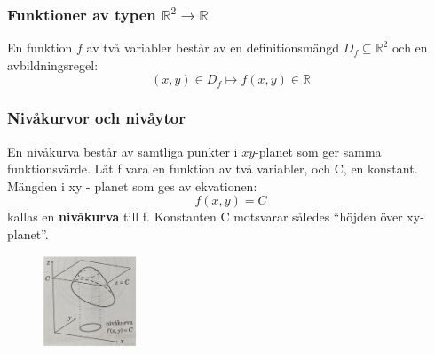 \documentclass[a4paper,12pt]{article}
\begin{document}
\subsubsection*{Funktioner av typen $\mathbb{R}^2 \to \mathbb{R}$}
En funktion $f$ av två variabler består av en definitionsmängd $D_f \subseteq \mathbb{R}^2$ och en avbildningsregel:
\[
(x,y) \in D_f \mapsto f(x,y) \in \mathbb{R}
\]

\subsubsection*{Nivåkurvor och nivåytor}
En nivåkurva består av samtliga punkter i $xy$-planet som ger samma funktionsvärde. 
Låt f vara en funktion av två variabler, och C, en konstant. Mängden i xy - planet som ges av ekvationen:
\[
    f(x,y) = C
\]
kallas en \textbf{nivåkurva} till f. Konstanten C motsvarar således “höjden över xy-planet”.
\begin{figure}[H]
  \centering
  \includegraphics[width=0.25\textwidth]{nivakurva.png}
\end{figure}
\end{document}
